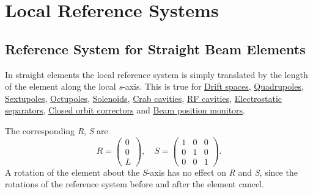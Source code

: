\section{Local Reference Systems}
\label{sec:local_ref}

\subsection{Reference System for Straight Beam Elements} 
\label{subsec:local_straight}
In straight elements the local reference system is simply translated by
the length of the element along the local {\it s}-axis. 
This is true for  
\hyperref[sec:drift]{Drift spaces}, 
\hyperref[sec:quadrupole]{Quadrupoles}, 
\hyperref[sec:sextupole]{Sextupoles}, 
\hyperref[sec:octupole]{Octupoles}, 
\hyperref[sec:solenoid]{Solenoids}, 
\hyperref[sec:crab_cavity]{Crab cavities},
\hyperref[sec:rf_cavity]{RF cavities},
\hyperref[sec:separator]{Electrostatic separators},
\hyperref[sec:kicker]{Closed orbit correctors} and
\hyperref[sec:monitor]{Beam position monitors}.


The corresponding {\it R}, {\it S} are 
\begin{equation}
R =
 \begin{pmatrix}
  0 \\
  0 \\
  L
 \end{pmatrix}
, \quad
S =
 \begin{pmatrix}
  1 & 0 &  0 \\
  0 & 1 &  0 \\
  0 & 0 &  1
 \end{pmatrix}
.
\end{equation}
A rotation of the element about the {\it S}-axis has no effect on
{\it R} and {\it S}, since the rotations of the reference system
before and after the element cancel.  

